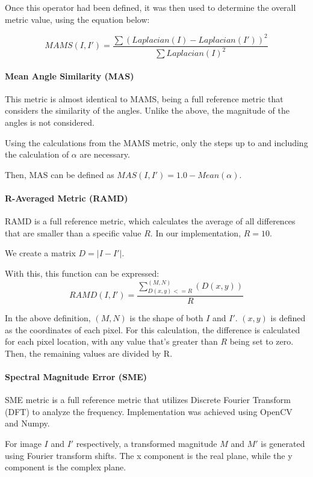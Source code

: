 \documentclass[12pt,a4paper]{article}
\begin{document}
            Once this operator had been defined, it was then used to determine the overall metric value, using the equation below:

            $$MAMS(I, I') = \frac{\sum (Laplacian(I) - Laplacian(I'))^2}{\sum Laplacian(I)^2}$$

            \paragraph{Mean Angle Similarity (MAS)}
            This metric is almost identical to MAMS, being a full reference metric that considers the similarity of the angles. Unlike the above, the magnitude of the angles is not considered.

            Using the calculations from the MAMS metric, only the steps up to and including the calculation of $\alpha$ are necessary. 

            Then, MAS can be defined as $MAS(I, I') = 1.0 - Mean(\alpha)$.

            \paragraph{R-Averaged Metric (RAMD)}
                RAMD is a full reference metric, which calculates the average of all differences that are smaller than a specific value $R$.
                In our implementation, $R=10$.

                We create a matrix $D = |I - I'|$.

                With this, this function can be expressed: $$RAMD(I, I') = \frac{\sum_{D(x, y) <= R}^{(M, N)}(D(x, y))}{R}$$

                In the above definition, $(M, N)$ is the shape of both $I$ and $I'$. $(x, y)$ is defined as the coordinates of each pixel. For this calculation,
                the difference is calculated for each pixel location, with any value that's greater than $R$ being set to zero. Then, the remaining values are divided by R.

            \paragraph{Spectral Magnitude Error (SME)}
                SME metric is a full reference metric that utilizes Discrete Fourier Transform (DFT) to analyze the frequency.
                Implementation was achieved using OpenCV and Numpy.

                For image $I$ and $I'$ respectively, a transformed magnitude $M$ and $M'$ is generated using Fourier transform shifts.
                The x component is the real plane, while the y component is the complex plane.
\end{document}
